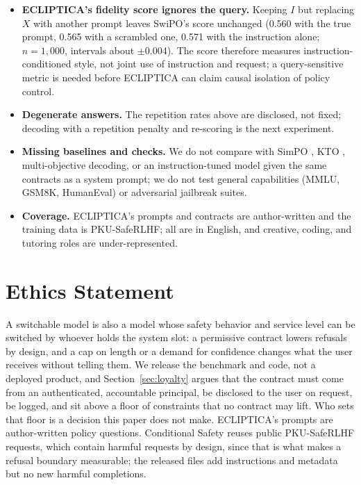 \documentclass[letterpaper]{article} %
\begin{document}
\begin{itemize}
    \item \textbf{ECLIPTICA's fidelity score ignores the query.} Keeping $I$ but replacing $X$ with another prompt leaves SwiPO's score unchanged (0.560 with the true prompt, 0.565 with a scrambled one, 0.571 with the instruction alone; $n=1{,}000$, intervals about $\pm$0.004). The score therefore measures instruction-conditioned style, not joint use of instruction and request; a query-sensitive metric is needed before ECLIPTICA can claim causal isolation of policy control.
    \item \textbf{Degenerate answers.} The repetition rates above are disclosed, not fixed; decoding with a repetition penalty and re-scoring is the next experiment.
    \item \textbf{Missing baselines and checks.} We do not compare with SimPO \cite{meng2024simpo}, KTO \cite{ethayarajh2024kto}, multi-objective decoding, or an instruction-tuned model given the same contracts as a system prompt; we do not test general capabilities (MMLU, GSM8K, HumanEval) or adversarial jailbreak suites.
    \item \textbf{Coverage.} ECLIPTICA's prompts and contracts are author-written and the training data is PKU-SafeRLHF; all are in English, and creative, coding, and tutoring roles are under-represented.
\end{itemize}

\section{Ethics Statement}

A switchable model is also a model whose safety behavior and service level can be switched by whoever holds the system slot: a permissive contract lowers refusals by design, and a cap on length or a demand for confidence changes what the user receives without telling them. We release the benchmark and code, not a deployed product, and Section~\ref{sec:loyalty} argues that the contract must come from an authenticated, accountable principal, be disclosed to the user on request, be logged, and sit above a floor of constraints that no contract may lift. Who sets that floor is a decision this paper does not make. ECLIPTICA's prompts are author-written policy questions. Conditional Safety reuses public PKU-SafeRLHF requests, which contain harmful requests by design, since that is what makes a refusal boundary measurable; the released files add instructions and metadata but no new harmful completions.
\end{document}
